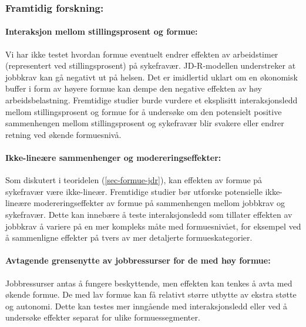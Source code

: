 \documentclass[
  12pt,
  a4paper,
  DIV=11,
  numbers=noendperiod]{scrartcl}
\let\oldparagraph\paragraph
\renewcommand{\paragraph}[1]{\oldparagraph{#1}\mbox{}}
\begin{document}
\subsubsection{Framtidig forskning:}\label{framtidig-forskning}

\paragraph{Interaksjon mellom stillingsprosent og
formue:}\label{interaksjon-mellom-stillingsprosent-og-formue}

Vi har ikke testet hvordan formue eventuelt endrer effekten av
arbeidstimer (representert ved stillingsprosent) på sykefravær.
JD-R-modellen understreker at jobbkrav kan gå negativt ut på helsen. Det
er imidlertid uklart om en økonomisk buffer i form av høyere formue kan
dempe den negative effekten av høy arbeidsbelastning. Fremtidige studier
burde vurdere et eksplisitt interaksjonsledd mellom stillingsprosent og
formue for å undersøke om den potensielt positive sammenhengen mellom
stillingsprosent og sykefravær blir svakere eller endrer retning ved
økende formuesnivå.

\paragraph{Ikke-lineære sammenhenger og
modereringseffekter:}\label{ikke-lineuxe6re-sammenhenger-og-modereringseffekter}

Som diskutert i teoridelen (\autoref{sec-formue-jdr}), kan effekten av
formue på sykefravær være ikke-lineær. Fremtidige studier bør utforske
potensielle ikke-lineære modereringseffekter av formue på sammenhengen
mellom jobbkrav og sykefravær. Dette kan innebære å teste
interaksjonsledd som tillater effekten av jobbkrav å variere på en mer
kompleks måte med formuesnivået, for eksempel ved å sammenligne effekter
på tvers av mer detaljerte formueskategorier.

\paragraph{Avtagende grensenytte av jobbressurser for de med høy
formue:}\label{avtagende-grensenytte-av-jobbressurser-for-de-med-huxf8y-formue}

Jobbressurser antas å fungere beskyttende, men effekten kan tenkes å
avta med økende formue. De med lav formue kan få relativt større utbytte
av ekstra støtte og autonomi. Dette kan testes mer inngående med
interaksjonsledd eller ved å undersøke effekter separat for ulike
formuessegmenter.
\end{document}
